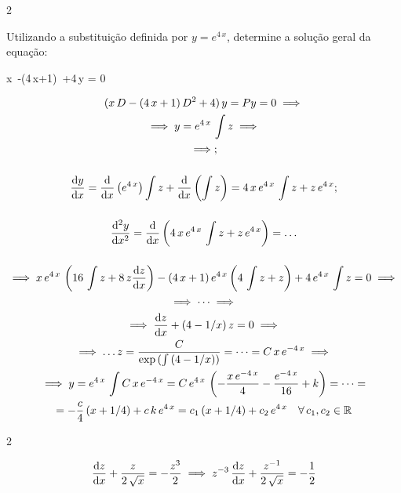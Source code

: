 \documentclass["./AM3C.exercises_resolutions.2024.tex"]{subfiles}
\begin{document}
\setcounter{question}{8}
\setcounter{subquestion}{1}
\begin{questionBox}2{} %

  Utilizando a substituição definida por \(y=e^{4\,x}\), determine a solução geral da equação:
  \begin{BM}
    x\,
    -(4\,x+1)\,
    +4\,y
    = 0
  \end{BM}

  \answer{}

  \begin{gather*}
    ( x\,D-(4\,x+1)\,D^2+4 )\,y
    =Py=0
    \implies \\
    \implies
    y=e^{4\,x}\,\int{z}
    \implies \\
    \implies
    ;        \\[3ex]
    \odv{y}{x}
    =\odv{}{x}\left(
      e^{4\,x}
    \right)
    \int{z}
    + \odv{}{x}\left(
      \int{z}
    \right)
    =4\,x\,e^{4\,x}
    \,\int{z}
    + z\,e^{4\,x}
    ;        \\[3ex]
    \odv[order=2]{y}{x}
    = \odv{}{x}\left(
      4\,x\,e^{4\,x}
      \,\int{z}
      + z\,e^{4\,x}
    \right)
    =\dots
    \\[3ex]
    \implies
    x\,e^{4\,x}
    \,\left(
      16\,\int{z}
      +8\,z
      \odv{z}{x}
    \right)
    -(4\,x+1)
    \,e^{4\,x}
    \left(
      4\,\int{z} +z
    \right)
    +4\,e^{4\,x}\,\int{z}
    =0
    \implies \\
    \implies
    \dots
    \implies \\
    \implies
    \odv{z}{x}+(4-1/x)\,z=0
    \implies \\
    \implies
    \dots
    z
    =\frac{C}{
      \exp{(\int{(4-1/x)})}
    }
    = \dots
    = C\,x\,e^{-4\,x}
    \implies \\
    \implies
    y
    =e^{4\,x}\,\int{C\,x\,e^{-4\,x}}
    = C\,e^{4\,x}\,\left(
      -\frac{x\,e^{-4\,x}}{4}
      -\frac{e^{-4\,x}}{16}
      +k
    \right)
    = \dots
    =        \\
    = -\frac{c}{4}\left(
      x+1/4
    \right)
    +c\,k\,e^{4\,x}
    = c_1\left(
      x+1/4
    \right)
    +c_2\,e^{4\,x}
    \quad\forall\,c_1,c_2\in\mathbb{R}
  \end{gather*}
\end{questionBox}

\setcounter{question}{9}
\setcounter{subquestion}{2}
\begin{questionBox}2{} %

  \answer{}

  \begin{gather*}
    \odv{z}{x}
    +\frac{z}{2\,\sqrt{x}}
    =-\frac{z^3}{2}
    \implies
    z^{-3}\,\odv{z}{x}
    +\frac{z^{-1}}{2\,\sqrt{x}}
    =-\frac{1}{2}
  \end{gather*}
\end{questionBox}
\end{document}
